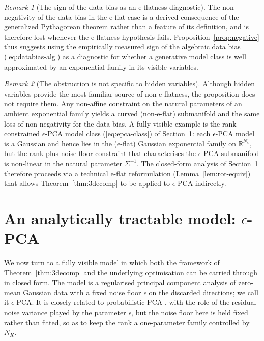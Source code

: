 \documentclass[11pt,a4paper]{article}
\theoremstyle{definition}
\theoremstyle{remark}
\newtheorem*{remark}{Remark}
\newcommand{\R}{\mathbb{R}}
\newcommand{\NK}{N_K}
\newcommand{\NV}{N_V}
\begin{document}
\begin{remark}[The sign of the data bias as an e-flatness diagnostic]
The non-negativity of the data bias in the e-flat case is a
derived consequence of the generalized Pythagorean theorem
rather than a feature of its definition, and is therefore lost
whenever the e-flatness hypothesis fails.
Proposition~\ref{prop:negative} thus suggests using the
empirically measured sign of the algebraic data bias
(\ref{eq:databias-alg}) as a diagnostic for whether a
generative model class is well approximated by an exponential
family in its visible variables.
\end{remark}

\begin{remark}[The obstruction is not specific to hidden variables]
\label{rem:not-only-hidden}
Although hidden variables provide the most familiar source of
non-e-flatness, the proposition does not require them. Any
non-affine constraint on the natural parameters of an ambient
exponential family yields a curved (non-e-flat) submanifold and
the same loss of non-negativity for the data bias. A fully
visible example is the rank-constrained $\epsilon$-PCA model
class (\ref{eq:epca-class}) of Section~\ref{sec:epca}: each
$\epsilon$-PCA model is a Gaussian and hence lies in the
(e-flat) Gaussian exponential family on $\R^{\NV}$, but the
rank-plus-noise-floor constraint that characterises the
$\epsilon$-PCA submanifold is non-linear in the natural
parameter $\Sigma^{-1}$. The closed-form analysis of
Section~\ref{sec:epca} therefore proceeds via a technical
e-flat reformulation (Lemma~\ref{lem:rot-equiv}) that allows
Theorem~\ref{thm:3decomp} to be applied to $\epsilon$-PCA
indirectly.
\end{remark}

\section{An analytically tractable model: $\epsilon$-PCA}
\label{sec:epca}

We now turn to a fully visible model in which both the framework
of Theorem~\ref{thm:3decomp} and the underlying optimisation can
be carried through in closed form. The model is a regularised
principal component analysis of zero-mean Gaussian data with a
fixed noise floor $\epsilon$ on the discarded directions; we call
it $\epsilon$-PCA. It is closely related to probabilistic PCA
\cite{TippingBishop1999}, with the role of the residual noise
variance played by the parameter $\epsilon$, but the noise floor
here is held fixed rather than fitted, so as to keep the rank a
one-parameter family controlled by $\NK$.
\end{document}
